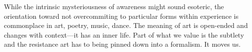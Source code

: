 \documentclass[12pt]{article}
\begin{document}
While the intrinsic mysteriousness of awareness might sound esoteric, the orientation toward not overcommiting to particular forms within experience is commonplace in art, poetry, music, dance. The meaning of art is open-ended and changes with context---it has an inner life. Part of what we value is the subtlety and the resistance art has to being pinned down into a formalism. It moves us.













\end{document}
